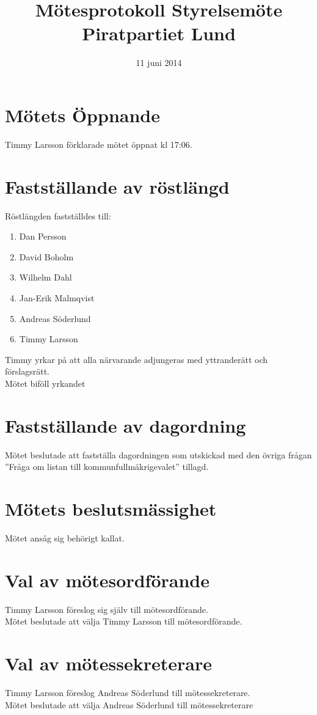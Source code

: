 \documentclass[a4paper,10pt]{article}
\title{\vspace{-1.5in}\textmd{\textbf{Mötesprotokoll Styrelsemöte Piratpartiet Lund}}}
\date{11 juni 2014}
\author{}
\begin{document}
\maketitle

\section{Mötets Öppnande}
Timmy Larsson förklarade mötet öppnat kl 17:06.

\section{Fastställande av röstlängd}
Röstlängden fastställdes till:
\begin{enumerate}
\item Dan Persson
\item David Boholm
\item Wilhelm Dahl
\item Jan-Erik Malmqvist
\item Andreas Söderlund
\item Timmy Larsson
\end{enumerate}

Timmy yrkar på att alla närvarande adjungeras med yttranderätt och förslagsrätt. \\
Mötet biföll yrkandet

\section{Fastställande av dagordning}
Mötet beslutade att fastställa dagordningen som utskickad med den övriga frågan ''Fråga om listan till kommunfullmäkrigevalet'' tillagd.

\section{Mötets beslutsmässighet}
Mötet ansåg sig behörigt kallat.

\newpage

\section{Val av mötesordförande}
Timmy Larsson föreslog sig själv till mötesordförande.\\
Mötet beslutade att välja Timmy Larsson till mötesordförande.

\section{Val av mötessekreterare}
Timmy Larsson föreslog Andreas Söderlund till mötessekreterare.\\
Mötet beslutade att välja Andreas Söderlund till mötessekreterare
\end{document}
